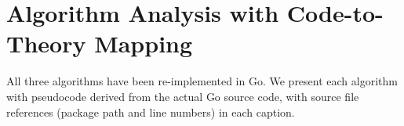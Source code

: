 \section{Algorithm Analysis with Code-to-Theory Mapping}
\label{sec:algorithms}
All three algorithms have been re-implemented in Go. We present each algorithm with pseudocode derived from the actual Go source code, with source file references (package path and line numbers) in each caption.


